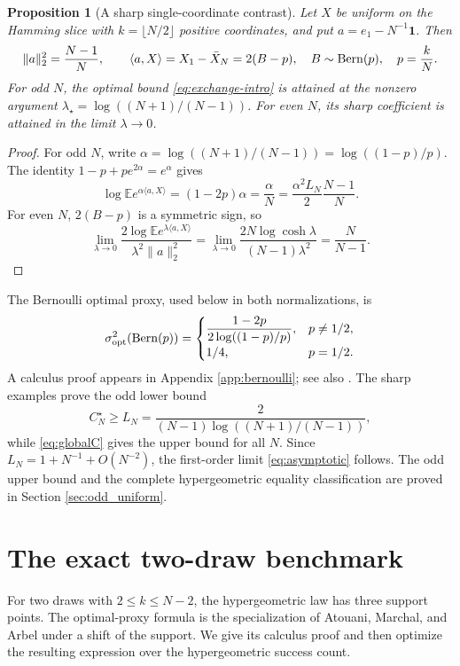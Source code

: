 \documentclass[11pt,a4paper]{article}
\newtheorem{proposition}[theorem]{Proposition}
\newcommand{\E}{\mathbb E}\newcommand{\R}{\mathbb R}\newcommand{\N}{\mathbb N}\newcommand{\one}{\mathbf1}
\begin{document}
\begin{proposition}[A sharp single-coordinate contrast]\label{prop:explicit_extremizer}
Let $X$ be uniform on the Hamming slice with $k=\lfloor N/2\rfloor$ positive coordinates, and put $a=e_1-N^{-1}\one$. Then
\[
 \|a\|_2^2=\frac{N-1}{N},\qquad
 \langle a,X\rangle=X_1-\bar X_N=2(B-p),
 \quad B\sim\operatorname{Bern}(p),\quad p=\frac{k}{N}.
\]
For odd $N$, the optimal bound \eqref{eq:exchange-intro} is attained at the nonzero argument $\lambda_\star=\log((N+1)/(N-1))$. For even $N$, its sharp coefficient is attained in the limit $\lambda\to0$.
\end{proposition}
\begin{proof}
For odd $N$, write $\alpha=\log((N+1)/(N-1))=\log((1-p)/p)$. The identity $1-p+pe^{2\alpha}=e^\alpha$ gives
\[
 \log\E e^{\alpha\langle a,X\rangle}
 =(1-2p)\alpha=\frac\alpha N
 =\frac{\alpha^2 L_N}{2}\frac{N-1}{N}.
\]
For even $N$, $2(B-p)$ is a symmetric sign, so
\[
 \lim_{\lambda\to0}\frac{2\log\E e^{\lambda\langle a,X\rangle}}
 {\lambda^2\|a\|_2^2}
 =\lim_{\lambda\to0}\frac{2N\log\cosh\lambda}{(N-1)\lambda^2}
 =\frac{N}{N-1}.
\]
\end{proof}

The Bernoulli optimal proxy, used below in both normalizations, is
\begin{equation}\label{eq:bernproxy}
 \sigma^2_{\mathrm{opt}}(\operatorname{Bern}(p))=
 \begin{cases}\displaystyle\frac{1-2p}{2\log((1-p)/p)},&p\ne1/2,\\[5pt]1/4,&p=1/2.
 \end{cases}
\end{equation}
A calculus proof appears in Appendix \ref{app:bernoulli}; see also \cite{ArbelMarchalNguyen}. The sharp examples prove the odd lower bound
\begin{equation}\label{eq:oddL}
 C_N^\star\ge L_N=\frac{2}{(N-1)\log((N+1)/(N-1))},
\end{equation}
while \eqref{eq:globalC} gives the upper bound for all $N$. Since $L_N=1+N^{-1}+O(N^{-2})$, the first-order limit \eqref{eq:asymptotic} follows. The odd upper bound and the complete hypergeometric equality classification are proved in Section \ref{sec:odd_uniform}.



\section{The exact two-draw benchmark}\label{sec:twodraw}
For two draws with $2\le k\le N-2$, the hypergeometric law has three support points. The optimal-proxy formula is the specialization of Atouani, Marchal, and Arbel \cite[Theorem 3.2 and Corollary 3.3]{AtouaniMarchalArbel} under a shift of the support. We give its calculus proof and then optimize the resulting expression over the hypergeometric success count.
\end{document}

